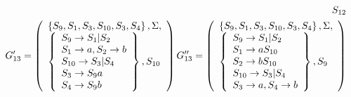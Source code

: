\begin{align*}
{	}{S_{12}}                                                                                      \\
	G'_{13} = \left( \begin{array}{l} \left\{S_9, S_1, S_3, S_{10}, S_3, S_4\right\}, \Sigma,\\\left\{\begin{array}{ll} 
	S_9 \to S_1|S_2                                                                                \\
	S_1 \to a, S_2 \to b                                                                           \\
	S_{10} \to S_3|S_4                                                                             \\
	S_3 \to S_9a                                                                                   \\
	S_4 \to S_9b                                                                                   \\
	 \end{array}\right\}, S_{10} \end{array} \right)
	G''_{13} = \left( \begin{array}{l} \left\{S_9, S_1, S_3, S_{10}, S_3, S_4\right\}, \Sigma,\\\left\{\begin{array}{ll} 
	S_9 \to S_1|S_2                                                                                \\
	S_1 \to aS_{10}                                                                                \\
	S_2 \to bS_{10}                                                                                \\
	S_{10} \to S_3|S_4                                                                             \\
	S_3 \to a, S_4 \to b                                                                           \\
	 \end{array}\right\}, S_9 \end{array} \right)                                                                                         \\
\end{align*}
